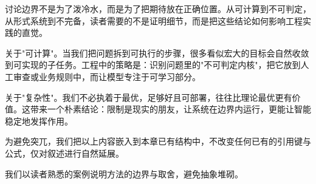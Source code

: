 讨论边界不是为了泼冷水，而是为了把期待放在正确位置。从可计算到不可判定，从形式系统到不完备，读者需要的不是证明细节，而是把这些结论如何影响工程实践的直觉。

关于"可计算"。当我们把问题拆到可执行的步骤，很多看似宏大的目标会自然收敛到可实现的子任务。工程中的策略是：识别问题里的"不可判定内核"，把它放到人工审查或业务规则中，而让模型专注于可学习部分。

关于"复杂性"。我们不必执着于最优，足够好且可部署，往往比理论最优更有价值。这带来一个朴素结论：限制是现实的朋友，让系统在边界内运行，更能让智能稳定地发挥作用。

为避免突兀，我们把以上内容嵌入到本章已有结构中，不改变任何已有的引用键与公式，仅对叙述进行自然延展。

我们以读者熟悉的案例说明方法的边界与取舍，避免抽象堆砌。
